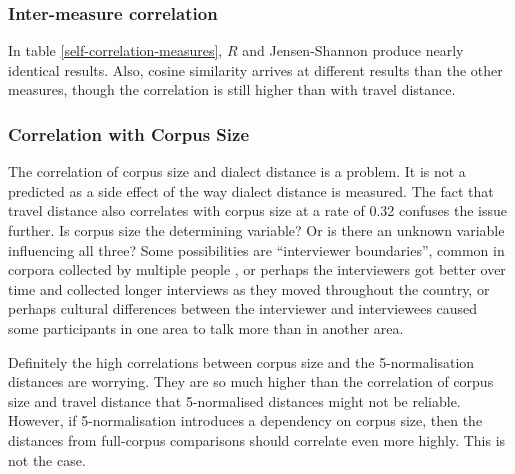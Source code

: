 
\subsubsection{Inter-measure correlation}

In table \ref{self-correlation-measures}, $R$ and Jensen-Shannon
produce nearly identical results. Also, cosine similarity arrives
at different results than the other measures, though the correlation
is still higher than with travel distance.

\subsubsection{Correlation with Corpus Size}

The correlation of corpus size and dialect distance is a problem. It
is not a predicted as a side effect of the way dialect distance is
measured. The fact that travel distance also correlates with corpus
size at a rate of 0.32 confuses the issue further. Is corpus size the
determining variable? Or is there an unknown variable influencing all
three? Some possibilities are ``interviewer boundaries'', common in
corpora collected by multiple people \cite{chambers98}, or perhaps the
interviewers got better over time and collected longer interviews as
they moved throughout the country, or perhaps cultural differences
between the interviewer and interviewees caused some participants in
one area to talk more than in another area.

Definitely the high correlations between corpus size and the
5-normalisation distances are worrying. They are so much higher than
the correlation of corpus size and travel distance that 5-normalised
distances might not be reliable.
However, if 5-normalisation introduces a dependency on corpus size,
then the distances from full-corpus comparisons should correlate even
more highly. This is not the case.

